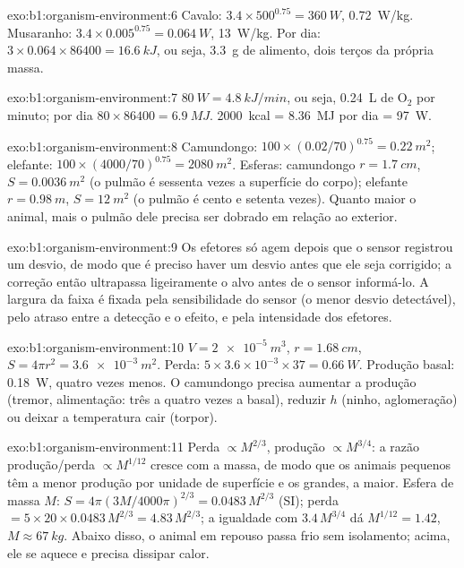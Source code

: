 \begin{solution}{exo:b1:organism-environment:6}
Cavalo: $3.4\times 500^{0.75} = \qty{360}{W}$, \qty{0.72}{W/kg}.
Musaranho: $3.4\times 0.005^{0.75} = \qty{0.064}{W}$, \qty{13}{W/kg}.
Por dia: $3\times 0.064\times 86400 = \qty{16.6}{kJ}$, ou seja,
\qty{3.3}{g} de alimento, dois terços da própria massa.
\end{solution}

\begin{solution}{exo:b1:organism-environment:7}
$\qty{80}{W} = \qty{4.8}{kJ/min}$, ou seja, \qty{0.24}{L} de
$\mathrm{O_2}$ por minuto; por dia $80\times 86400 = \qty{6.9}{MJ}$.
\qty{2000}{kcal} = \qty{8.36}{MJ} por dia = \qty{97}{W}.
\end{solution}

\begin{solution}{exo:b1:organism-environment:8}
Camundongo: $100\times(0.02/70)^{0.75} = \qty{0.22}{m^2}$; elefante:
$100\times(4000/70)^{0.75} = \qty{2080}{m^2}$. Esferas: camundongo
$r = \qty{1.7}{cm}$, $S = \qty{0.0036}{m^2}$ (o pulmão é sessenta vezes
a superfície do corpo); elefante $r = \qty{0.98}{m}$,
$S = \qty{12}{m^2}$ (o pulmão é cento e setenta vezes). Quanto maior o
animal, mais o pulmão dele precisa ser dobrado em relação ao exterior.
\end{solution}

\begin{solution}{exo:b1:organism-environment:9}
Os efetores só agem depois que o sensor registrou um desvio, de modo que
é preciso haver um desvio antes que ele seja corrigido; a correção então
ultrapassa ligeiramente o alvo antes de o sensor informá-lo. A largura
da faixa é fixada pela sensibilidade do sensor (o menor desvio
detectável), pelo atraso entre a detecção e o efeito, e pela intensidade
dos efetores.
\end{solution}

\begin{solution}{exo:b1:organism-environment:10}
$V = \qty{2e-5}{m^3}$, $r = \qty{1.68}{cm}$, $S = 4\pi r^2 =
\qty{3.6e-3}{m^2}$. Perda: $5\times 3.6\times 10^{-3}\times 37 =
\qty{0.66}{W}$. Produção basal: \qty{0.18}{W}, quatro vezes menos. O
camundongo precisa aumentar a produção (tremor, alimentação: três a
quatro vezes a basal), reduzir $h$ (ninho, aglomeração) ou deixar a
temperatura cair (torpor).
\end{solution}

\begin{solution}{exo:b1:organism-environment:11}
Perda $\propto M^{2/3}$, produção $\propto M^{3/4}$: a razão
produção/perda $\propto M^{1/12}$ cresce com a massa, de modo que os
animais pequenos têm a menor produção por unidade de superfície e os
grandes, a maior. Esfera de massa $M$:
$S = 4\pi(3M/4000\pi)^{2/3} = \num{0.0483}\,M^{2/3}$ (SI); perda
$= 5\times 20\times 0.0483\,M^{2/3} = 4.83\,M^{2/3}$; a igualdade com
$3.4\,M^{3/4}$ dá $M^{1/12} = 1.42$, $M \approx \qty{67}{kg}$. Abaixo
disso, o animal em repouso passa frio sem isolamento; acima, ele se
aquece e precisa dissipar calor.
\end{solution}

